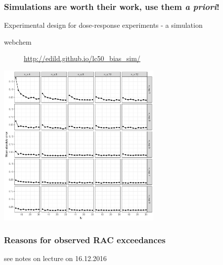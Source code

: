\documentclass[10pt
	]{beamer}
\begin{document}
\begin{frame}
\frametitle{Simulations are worth their work, use them \emph{a priori}!}
Experimental design for dose-response experiments - a simulation
\begin{description}
	\item[webchem]{\url{http://edild.github.io/lc50_bias_sim/}}
\end{description}
	    	\includegraphics[width=0.6\textwidth, keepaspectratio]{figs/sim_drm.png}
\end{frame}



\begin{frame}
\frametitle{Reasons for observed RAC exceedances}
see notes on lecture on 16.12.2016

\end{frame}
\end{document}
